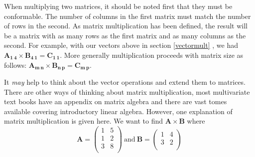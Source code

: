 
When multiplying two matrices, it should be noted first that they must be conformable.   The number of columns in the first matrix must match the number of rows in the second.   As matrix multiplication has been defined, the result will be a matrix with as many rows as the first matrix and as many columns as the second.   For example, with our vectors above in section \ref{vectormult} , we had $\boldsymbol{A_{1\ 4}} \times \boldsymbol{B_{4\ 1}} = \boldsymbol{C_{1\ 1}}$.   More generally multiplication proceeds with matrix size as follows: $\boldsymbol{A_{m\ n}} \times \boldsymbol{B_{n\ p}} = \boldsymbol{C_{m\ p}}$.

It \emph{may} help to think about the vector operations and extend them to matrices.   There are other ways of thinking about matrix multiplication, most multivariate text books have an appendix on matrix algebra and there are vast tomes available covering introductory linear algebra.   However, one explanation of matrix multiplication is given here.   We want to find $\boldsymbol{A} \times  \boldsymbol{B}$ where
\begin{displaymath}
\mathbf{A} = 
\left( \begin{array}{rr}
1 & 5 \\
1 & 2 \\
3 & 8 \\
\end{array}
\right)
\ \mbox{and}\ \mathbf{B} = 
\left( \begin{array}{rr}
1 & 4 \\
3 & 2 \\
\end{array}
\right)
\end{displaymath}

